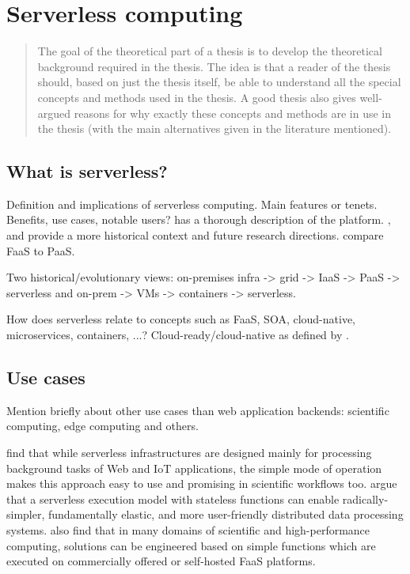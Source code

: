 \documentclass[utf8,english]{gradu3}
\begin{document}
\chapter{Serverless computing}

\begin{quote}
The goal of the theoretical part of a thesis is to develop the theoretical background required in the thesis.  The idea is that a reader of the thesis should, based on just the thesis itself, be able to understand all the special concepts and methods used in the thesis. A good thesis also gives well-argued reasons for why exactly these concepts and methods are in use in the thesis (with the main alternatives given in the literature mentioned).
\end{quote}

\section{What is serverless?}

Definition and implications of serverless computing. Main features or tenets. Benefits, use cases, notable users? \textcite{robert2016serverlessarchitectures} has a thorough description of the platform.  \textcite{van2017spec}, \textcite{varghese18next} and \textcite{buyya2017manifesto} provide a more historical context and future research directions. \textcite{albuquerque17faaspaas} compare FaaS to PaaS.

Two historical/evolutionary views: on-premises infra -> grid -> IaaS -> PaaS -> serverless and on-prem -> VMs -> containers -> serverless.

How does serverless relate to concepts such as FaaS, SOA, cloud-native, microservices, containers, ...? Cloud-ready/cloud-native as defined by \textcite{pozdniakova17cloudready}.

\section{Use cases}

Mention briefly about other use cases than web application backends: scientific computing, edge computing and others.

\textcite{malawski17executescientific} find that while serverless infrastructures are designed mainly for processing background tasks of Web and IoT applications, the simple mode of operation makes this approach easy to use and promising in scientific workflows too. \textcite{jonas17occupy} argue that a serverless execution model with stateless functions can enable radically-simpler, fundamentally elastic, and more user-friendly distributed data processing systems. \textcite{spillner18faaster} also find that in many domains of scientific and high-performance computing, solutions can be engineered based on simple functions which are executed on commercially offered or self-hosted FaaS platforms.
\end{document}
